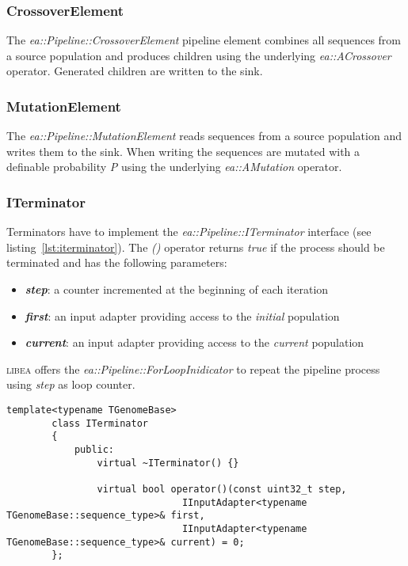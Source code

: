 \documentclass[a4paper]{article}
\begin{document}
\subsubsection*{CrossoverElement}

The \textit{ea::Pipeline::CrossoverElement} pipeline element combines all sequences from a source population and produces children using the underlying \textit{ea::ACrossover} operator. Generated children are written to the sink.

\subsubsection*{MutationElement}

The \textit{ea::Pipeline::MutationElement} reads sequences from a source population and writes them to the sink. When writing the sequences are mutated with a definable probability \textit{P} using the underlying \textit{ea::AMutation} operator.

\subsubsection*{ITerminator}

Terminators have to implement the \textit{ea::Pipeline::ITerminator} interface (see listing~\ref{lst:iterminator}). The \textit{()} operator returns \textit{true} if the process should be terminated and has the following parameters:

\begin{itemize}
	\item \textbf{\textit{step}}: a counter incremented at the beginning of each iteration
	\item \textbf{\textit{first}}: an input adapter providing access to the \textit{initial} population
	\item \textbf{\textit{current}}: an input adapter providing access to the \textit{current} population
\end{itemize}

\textsc{libea} offers the \textit{ea::Pipeline::ForLoopInidicator} to repeat the pipeline process using \textit{step} as loop counter.

\begin{lstlisting}[caption=ITerminator,label=lst:iterminator]
		template<typename TGenomeBase>
		class ITerminator
		{
			public:
				virtual ~ITerminator() {}

				virtual bool operator()(const uint32_t step,
						       IInputAdapter<typename TGenomeBase::sequence_type>& first,
						       IInputAdapter<typename TGenomeBase::sequence_type>& current) = 0;
		};
\end{lstlisting}
\end{document}
